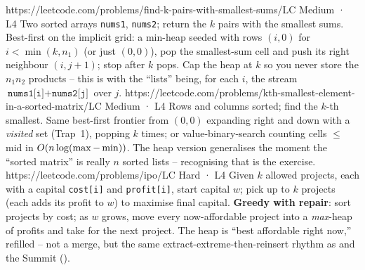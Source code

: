 \begin{practiceset}
    {https://leetcode.com/problems/find-k-pairs-with-smallest-sums/}{LC Medium · L4}
    {Two sorted arrays \texttt{nums1}, \texttt{nums2}; return the $k$ pairs with the smallest sums. Best-first
    on the implicit grid: a min-heap seeded with rows $(i,0)$ for $i<\min(k, n_1)$ (or just $(0,0)$), pop the
    smallest-sum cell and push its right neighbour $(i,j{+}1)$; stop after $k$ pops. Cap the heap at $k$ so you
    never store the $n_1 n_2$ products -- this is  with the ``lists'' being, for each
    $i$, the stream $\texttt{nums1[i]}+\texttt{nums2[j]}$ over $j$.}
    {https://leetcode.com/problems/kth-smallest-element-in-a-sorted-matrix/}{LC Medium · L4}
    {Rows and columns sorted; find the $k$-th smallest. Same best-first frontier from $(0,0)$ expanding
    right and down with a \emph{visited} set (Trap~1), popping $k$ times; or value-binary-search counting cells
    $\le$ mid in $O(n\log(\max-\min))$. The heap version generalises the moment the ``sorted matrix'' is
    really $n$ sorted lists -- recognising that is the exercise.}
    {https://leetcode.com/problems/ipo/}{LC Hard · L4}
    {Given $k$ allowed projects, each with a capital \texttt{cost[i]} and \texttt{profit[i]}, start capital $w$;
    pick up to $k$ projects (each adds its profit to $w$) to maximise final capital. \textbf{Greedy with
    repair}: sort projects by cost; as $w$ grows, move every now-affordable project into a \emph{max}-heap of
    profits and take  for the next project. The heap is ``best affordable right now,'' refilled --
    not a merge, but the same extract-extreme-then-reinsert rhythm as  and the Summit
    ().}
\end{practiceset}


